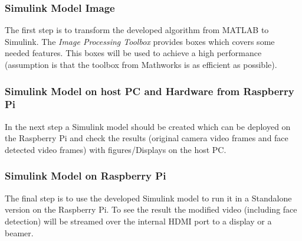 \documentclass[Bachelorarbeit.tex]{subfiles}
\begin{document}
\subsubsection{Simulink Model Image}
The first step is to transform the developed algorithm from MATLAB to Simulink. The \textit{Image Processing Toolbox} provides boxes which covers some needed features. This boxes will be used to achieve a high performance (assumption is that the toolbox from Mathworks is as efficient as possible). 

\subsubsection{Simulink Model on host PC and Hardware from Raspberry Pi}
In the next step a Simulink model should be created which can be deployed on the Raspberry Pi and check the results (original camera video frames and face detected video frames) with figures/Displays on the host PC.

\subsubsection{Simulink Model on Raspberry Pi}
The final step is to use the developed Simulink model to run it in a Standalone version on the Raspberry Pi. To see the result the modified video (including face detection) will be streamed over the internal HDMI port to a display or a beamer. 
\end{document}
